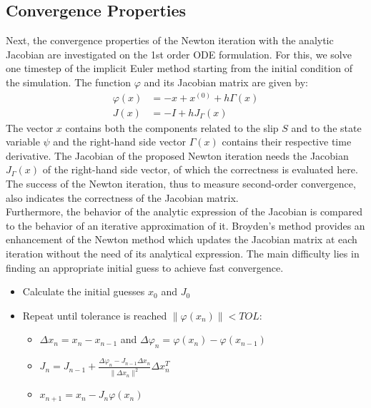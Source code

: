 \subsection{Convergence Properties}
Next, the convergence properties of the Newton iteration with the analytic Jacobian are investigated on the 1st order ODE formulation. For this, we solve one timestep of the implicit Euler method starting from the initial condition of the simulation. The function $\varphi$ and its Jacobian matrix are given by:
\begin{align}
\varphi(x) &= -x + x^{(0)} + h \Gamma(x) \\
J(x) &= -I + h J_\Gamma(x)
\end{align}
The vector $x$ contains both the components related to the slip $S$ and to the state variable $\psi$ and the right-hand side vector $\Gamma(x)$ contains their respective time derivative. The Jacobian of the proposed Newton iteration needs the Jacobian $J_\Gamma(x)$ of the right-hand side vector, of which the correctness is evaluated here. The success of the Newton iteration, thus to measure second-order convergence, also indicates the correctness of the Jacobian matrix. \\
Furthermore, the behavior of the analytic expression of the Jacobian is compared to the behavior of an iterative approximation of it. Broyden's method \cite{BroydenIteration} provides an enhancement of the Newton method which updates the Jacobian matrix at each iteration without the need of its analytical expression. The main difficulty lies in finding an appropriate initial guess to achieve fast convergence. 

\begin{itemize}
	\item Calculate the initial guesses $x_0$ and $J_0$
	\item Repeat until tolerance is reached $\|\varphi(x_n)\| < TOL$: 
	\begin{itemize}
		\item $\Delta x_n = x_n - x_{n-1}$ and $\Delta \varphi_n = \varphi(x_n) - \varphi(x_{n-1})$ 
		\item $J_n = J_{n-1} + \frac{\Delta \varphi_n - J_{n-1}\Delta x_n}{\|\Delta x_n\|^2} \Delta x_n^T$
		\item $x_{n+1} = x_n - J_n \varphi(x_n)$
	\end{itemize} 
\end{itemize}


